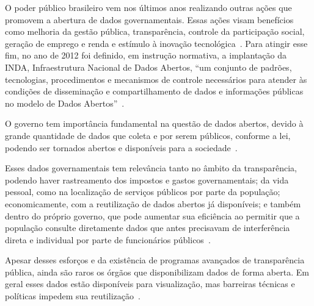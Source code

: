 O poder público brasileiro vem nos últimos anos realizando outras ações que promovem a abertura de dados governamentais. Essas ações visam benefícios como melhoria da gestão pública, transparência, controle da participação social, geração de emprego e renda e estímulo à inovação tecnológica~\cite{tcu}. Para atingir esse fim, no ano de 2012 foi definido, em instrução normativa, a implantação da INDA, Infraestrutura Nacional de Dados Abertos, \enquote{um conjunto de padrões, tecnologias, procedimentos e mecanismos de controle necessários para atender às condições de disseminação e compartilhamento de dados e informações públicas no modelo de Dados Abertos}~\cite{inda}.  

O governo tem importância fundamental na questão de dados abertos, devido à grande quantidade de dados que coleta e por serem públicos, conforme a lei, podendo ser tornados abertos e disponíveis para a sociedade~\cite{openknowledge}.

Esses dados governamentais tem relevância tanto no âmbito da transparência, podendo haver rastreamento dos impostos e gastos governamentais; da vida pessoal, como na localização de serviços públicos por parte da população; economicamente, com a reutilização de dados abertos já disponíveis; e também dentro do próprio governo, que pode aumentar sua eficiência ao permitir que a população consulte diretamente dados que antes precisavam de interferência direta e individual por parte de funcionários públicos~\cite{openknowledge}.

Apesar desses esforços e da existência de programas avançados de transparência pública, ainda são raros os órgãos que disponibilizam dados de forma aberta. Em geral esses dados estão disponíveis para visualização, mas barreiras técnicas e políticas impedem sua reutilização~\cite{w3cmanual}.








